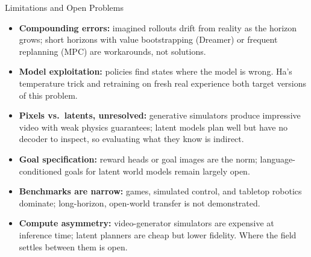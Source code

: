 \begin{frame}{Limitations and Open Problems}
  \begin{itemize}\itemsep0.18em
    \item \textbf{Compounding errors:} imagined rollouts drift from reality as the horizon grows; short horizons with value bootstrapping (Dreamer) or frequent replanning (MPC) are workarounds, not solutions.
    \item \textbf{Model exploitation:} policies find states where the model is wrong. Ha's temperature trick and retraining on fresh real experience both target versions of this problem.
    \item \textbf{Pixels vs.\ latents, unresolved:} generative simulators produce impressive video with weak physics guarantees; latent models plan well but have no decoder to inspect, so evaluating what they know is indirect.
    \item \textbf{Goal specification:} reward heads or goal images are the norm; language-conditioned goals for latent world models remain largely open.
    \item \textbf{Benchmarks are narrow:} games, simulated control, and tabletop robotics dominate; long-horizon, open-world transfer is not demonstrated.
    \item \textbf{Compute asymmetry:} video-generator simulators are expensive at inference time; latent planners are cheap but lower fidelity. Where the field settles between them is open.
  \end{itemize}
\end{frame}
